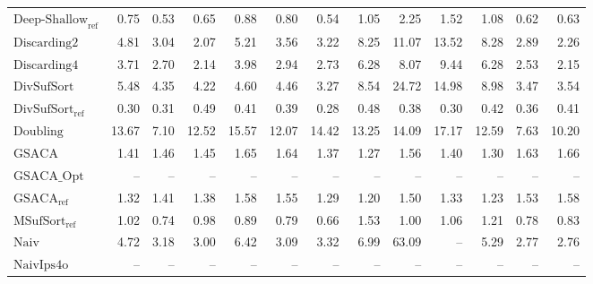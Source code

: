 \begin{table}[ht]
{\begin{tabular}{lrrrrrrrrrrrr}
    $\text{Deep-Shallow}_{\text{ref}}$ & 0.75 & {\color{green!60!black}0.53} & {\color{green!60!black}0.65} & 0.88 & 0.80 & 0.54 & 1.05 & 2.25 & 1.52 & 1.08 & 0.62 & 0.63 \\
    $\text{Discarding2}$ & 4.81 & 3.04 & 2.07 & 5.21 & 3.56 & 3.22 & 8.25 & 11.07 & {\color{red}13.52} & {\color{red}8.28} & 2.89 & 2.26 \\
    $\text{Discarding4}$ & 3.71 & 2.70 & 2.14 & 3.98 & 2.94 & 2.73 & 6.28 & 8.07 & 9.44 & 6.28 & 2.53 & 2.15 \\
    $\text{DivSufSort}$ & 5.48 & 4.35 & 4.22 & 4.60 & 4.46 & 3.27 & 8.54 & {\color{red}24.72} & {\color{red}14.98} & {\color{red}8.98} & 3.47 & 3.54 \\
    $\text{DivSufSort}_{\text{ref}}$ & {\color{green!60!black}0.30} & {\color{green!60!black}0.31} & {\color{green!60!black}0.49} & {\color{green!60!black}0.41} & {\color{green!60!black}0.39} & {\color{green!60!black}0.28} & {\color{green!60!black}0.48} & {\color{green!60!black}0.38} & {\color{green!60!black}0.30} & {\color{green!60!black}0.42} & {\color{green!60!black}0.36} & {\color{green!60!black}0.41} \\
    $\text{Doubling}$ & {\color{red}13.67} & {\color{red}7.10} & {\color{red}12.52} & {\color{red}15.57} & {\color{red}12.07} & {\color{red}14.42} & {\color{red}13.25} & 14.09 & {\color{red}17.17} & {\color{red}12.59} & {\color{red}7.63} & {\color{red}10.20} \\
    $\text{GSACA}$ & 1.41 & 1.46 & 1.45 & 1.65 & 1.64 & 1.37 & 1.27 & 1.56 & 1.40 & 1.30 & 1.63 & 1.66 \\
    $\text{GSACA\_Opt}$ & {\color{darkgray}--} & {\color{darkgray}--} & {\color{darkgray}--} & {\color{darkgray}--} & {\color{darkgray}--} & {\color{darkgray}--} & {\color{darkgray}--} & {\color{darkgray}--} & {\color{darkgray}--} & {\color{darkgray}--} & {\color{darkgray}--} & {\color{darkgray}--} \\
    $\text{GSACA}_{\text{ref}}$ & 1.32 & 1.41 & 1.38 & 1.58 & 1.55 & 1.29 & 1.20 & 1.50 & 1.33 & 1.23 & 1.53 & 1.58 \\
    $\text{MSufSort}_{\text{ref}}$ & 1.02 & 0.74 & 0.98 & 0.89 & 0.79 & 0.66 & 1.53 & 1.00 & 1.06 & 1.21 & 0.78 & 0.83 \\
    $\text{Naiv}$ & 4.72 & 3.18 & 3.00 & 6.42 & 3.09 & 3.32 & 6.99 & {\color{red}63.09} & {\color{darkgray}--} & 5.29 & 2.77 & 2.76 \\
    $\text{NaivIps4o}$ & {\color{darkgray}--} & {\color{darkgray}--} & {\color{darkgray}--} & {\color{darkgray}--} & {\color{darkgray}--} & {\color{darkgray}--} & {\color{darkgray}--} & {\color{darkgray}--} & {\color{darkgray}--} & {\color{darkgray}--} & {\color{darkgray}--} & {\color{darkgray}--} \\

\end{tabular}}
\end{table}
